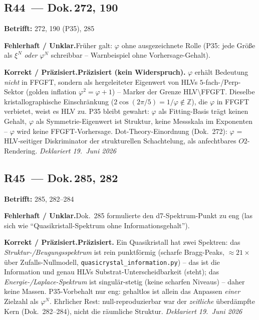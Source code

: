 \medskip


\subsection*{R44~--- Dok.\,272, 190}

\noindent\textbf{Betrifft:} 272, 190 (P35), 285


\smallskip\noindent\textbf{Fehlerhaft / Unklar.}\quad Fr\"uher galt: $\varphi$ ohne ausgezeichnete Rolle (P35: jede Gr\"o\ss e als $\xi^N$ \emph{oder} $\varphi^N$ schreibbar -- Warnbeispiel ohne Vorhersage-Gehalt).


\smallskip\noindent\textbf{Korrekt / Präzisiert.}\quad \textbf{Pr\"azisiert (kein Widerspruch).} $\varphi$ erh\"alt Bedeutung \emph{nicht} in FFGFT, sondern als hergeleiteter Eigenwert von HLVs $5$-fach-/Perp-Sektor (golden inflation $\varphi^2=\varphi+1$) -- Marker der Grenze HLV$\setminus$FFGFT. Dieselbe kristallographische Einschr\"ankung ($2\cos(2\pi/5)=1/\varphi\notin\mathbb{Z}$), die $\varphi$ in FFGFT verbietet, weist es HLV zu. P35 bleibt gewahrt: $\varphi$ als Fitting-Basis tr\"agt keinen Gehalt, $\varphi$ als Symmetrie-Eigenwert ist Struktur, keine Messskala im Exponenten -- $\varphi$ wird keine FFGFT-Vorhersage. Dot-Theory-Einordnung (Dok.~272): $\varphi$ = HLV-seitiger Diskriminator der strukturellen Schachtelung, als anfechtbares $O2$-Rendering. \emph{Deklariert 19.~Juni 2026}


\medskip


\subsection*{R45~--- Dok.\,285, 282}

\noindent\textbf{Betrifft:} 285, 282--284


\smallskip\noindent\textbf{Fehlerhaft / Unklar.}\quad Dok.~285 formulierte den d7-Spektrum-Punkt zu eng (las sich wie ``Quasikristall-Spektrum ohne Informationsgehalt'').


\smallskip\noindent\textbf{Korrekt / Präzisiert.}\quad \textbf{Pr\"azisiert.} Ein Quasikristall hat zwei Spektren: das \emph{Struktur-/Beugungsspektrum} ist rein punktf\"ormig (scharfe Bragg-Peaks, $\approx21\times$ \"uber Zufalls-Nullmodell, \texttt{quasicrystal\_information.py}) -- das ist die Information und genau HLVs Substrat-Unterscheidbarkeit (steht); das \emph{Energie-/Laplace-Spektrum} ist singul\"ar-stetig (keine scharfen Niveaus) -- daher keine Massen. P35-Vorbehalt nur eng: gehaltlos ist allein das Anpassen \emph{einer} Zielzahl als $\varphi^N$. Ehrlicher Rest: null-reproduzierbar war der \emph{zeitliche} \"uberd\"ampfte Kern (Dok.~282--284), nicht die r\"aumliche Struktur. \emph{Deklariert 19.~Juni 2026}



